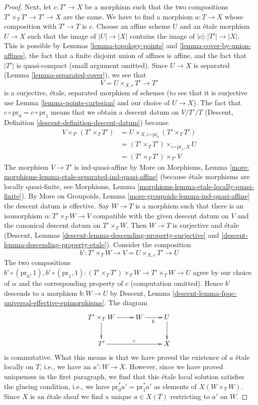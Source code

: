 \documentclass{stacks-project}
\theoremstyle{plain}
\theoremstyle{definition}
\theoremstyle{remark}
\numberwithin{equation}{subsection}
\begin{document}
\begin{proof}
\medskip\noindent
Next, let $c : T' \to X$ be a morphism such that the two compositions
$T' \times_T T' \to T' \to X$ are the same. We have to find a morphism
$a : T \to X$ whose composition with $T' \to T$ is $c$. Choose an
affine scheme $U$ and an \'etale morphism $U \to X$ such that the image
of $|U| \to |X|$ contains the image of $|c| : |T'| \to |X|$.
This is possible by Lemmas \ref{lemma-topology-points} and
\ref{lemma-cover-by-union-affines}, the fact that a finite disjoint union of
affines is affine, and the fact that $|T'|$ is quasi-compact
(small argument omitted). Since $U \to X$ is separated
(Lemma \ref{lemma-separated-cover}), we see that
$$
V = U \times_{X, c} T' \longrightarrow T'
$$
is a surjective, \'etale, separated morphism of schemes
(to see that it is surjective use Lemma \ref{lemma-points-cartesian}
and our choice of $U \to X$). The fact that
$c \circ \text{pr}_0 = c \circ \text{pr}_1$ means that we obtain a
descent datum on $V/T'/T$
(Descent, Definition \ref{descent-definition-descent-datum})
because
\begin{align*}
V \times_{T'} (T' \times_T T')
& =
U \times_{X, c \circ \text{pr}_0} (T' \times_T T') \\
& =
(T' \times_T T') \times_{c \circ \text{pr}_1, X} U \\
& =
(T' \times_T T') \times_{T'} V
\end{align*}
The morphism $V \to T'$ is ind-quasi-affine by
More on Morphisms, Lemma
\ref{more-morphisms-lemma-etale-separated-ind-quasi-affine}
(because \'etale morphisms are locally quasi-finite, see
Morphisms, Lemma \ref{morphisms-lemma-etale-locally-quasi-finite}).
By More on Groupoids, Lemma \ref{more-groupoids-lemma-ind-quasi-affine}
the descent datum is effective. Say $W \to T$ is a morphism
such that there is an isomorphism $\alpha : T' \times_T W \to V$
compatible with the given descent datum on $V$ and the canonical descent
datum on $T' \times_T W$. Then $W \to T$ is surjective and \'etale
(Descent, Lemmas \ref{descent-lemma-descending-property-surjective} and
\ref{descent-lemma-descending-property-etale}).
Consider the composition
$$
b' : T' \times_T W \longrightarrow V = U \times_{X, c} T' \longrightarrow U
$$
The two compositions
$b' \circ (\text{pr}_0, 1), 
b' \circ (\text{pr}_1, 1) :
(T' \times_T T') \times_T W \to T' \times_T W \to U$
agree by our choice of $\alpha$ and the corresponding property of $c$
(computation omitted). Hence $b'$ descends to a morphism $b : W \to U$ by
Descent, Lemma \ref{descent-lemma-fpqc-universal-effective-epimorphisms}.
The diagram
$$
\xymatrix{
T' \times_T W \ar[r] \ar[d] & W \ar[r]_b & U \ar[d] \\
T' \ar[rr]^c &  & X
}
$$
is commutative. What this means is that we have proved the existence
of $a$ \'etale locally on $T$, i.e., we have an $a' : W \to X$.
However, since we have proved uniqueness
in the first paragraph, we find that this \'etale local solution
satisfies the glueing condition, i.e., we have
$\text{pr}_0^*a' = \text{pr}_1^*a'$ as elements of $X(W \times_T W)$.
Since $X$ is an \'etale sheaf we find a unique $a \in X(T)$ restricting
to $a'$ on $W$.
\end{proof}
\end{document}
